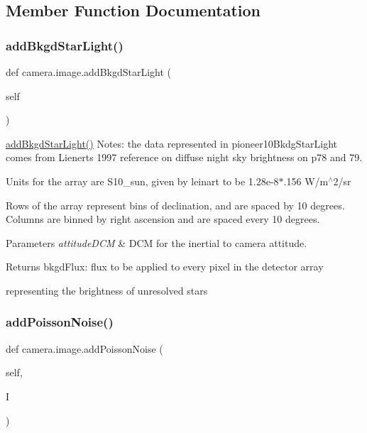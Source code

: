\subsection{Member Function Documentation}
\mbox{\label{classcamera_1_1image_a2a423c50f436f31466814408b7d47c66}} 
\subsubsection{\texorpdfstring{add\+Bkgd\+Star\+Light()}{addBkgdStarLight()}}
{\footnotesize\ttfamily def camera.\+image.\+add\+Bkgd\+Star\+Light (\begin{DoxyParamCaption}\item[{}]{self }\end{DoxyParamCaption})}



\hyperlink{classcamera_1_1image_a2a423c50f436f31466814408b7d47c66}{add\+Bkgd\+Star\+Light()} Notes\+: the data represented in pioneer10\+Bkdg\+Star\+Light comes from Lienert\textquotesingle{}s 1997 reference on diffuse night sky brightness on p78 and 79. 

Units for the array are S10\+\_\+sun, given by leinart to be 1.\+28e-\/8$\ast$.156 W/m$^\wedge$2/sr

Rows of the array represent bins of declination, and are spaced by 10 degrees. Columns are binned by right ascension and are spaced every 10 degrees. 
\begin{DoxyParams}{Parameters}
{\em attitude\+D\+CM} & D\+CM for the inertial to camera attitude.\\
\hline
\end{DoxyParams}
\begin{DoxyReturn}{Returns}
bkgd\+Flux\+: flux to be applied to every pixel in the detector array 

representing the brightness of unresolved stars 
\end{DoxyReturn}
\mbox{\label{classcamera_1_1image_aedd03c3f51edba0e50a4ae231498a503}} 
\subsubsection{\texorpdfstring{add\+Poisson\+Noise()}{addPoissonNoise()}}
{\footnotesize\ttfamily def camera.\+image.\+add\+Poisson\+Noise (\begin{DoxyParamCaption}\item[{}]{self,  }\item[{}]{I }\end{DoxyParamCaption})}



